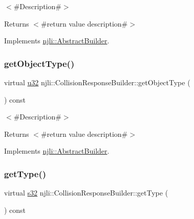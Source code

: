 $<$\#\+Description\#$>$

\begin{DoxyReturn}{Returns}
$<$\#return value description\#$>$ 
\end{DoxyReturn}


Implements \mbox{\hyperlink{classnjli_1_1_abstract_builder_a902f73ea78031b06aca183a417f3413b}{njli\+::\+Abstract\+Builder}}.

\mbox{\label{classnjli_1_1_collision_response_builder_a591d32b0605daad09aa789608105e5df}} 
\subsubsection{\texorpdfstring{get\+Object\+Type()}{getObjectType()}}
{\footnotesize\ttfamily virtual \mbox{\hyperlink{_util_8h_a10e94b422ef0c20dcdec20d31a1f5049}{u32}} njli\+::\+Collision\+Response\+Builder\+::get\+Object\+Type (\begin{DoxyParamCaption}{ }\end{DoxyParamCaption}) const\hspace{0.3cm}{\ttfamily [virtual]}}

$<$\#\+Description\#$>$

\begin{DoxyReturn}{Returns}
$<$\#return value description\#$>$ 
\end{DoxyReturn}


Implements \mbox{\hyperlink{classnjli_1_1_abstract_builder_a0f2d344fcf697b167f4f2b1122b5fb33}{njli\+::\+Abstract\+Builder}}.

\mbox{\label{classnjli_1_1_collision_response_builder_a38a4a2b429c82f2031349228b4d70967}} 
\subsubsection{\texorpdfstring{get\+Type()}{getType()}}
{\footnotesize\ttfamily virtual \mbox{\hyperlink{_util_8h_aa62c75d314a0d1f37f79c4b73b2292e2}{s32}} njli\+::\+Collision\+Response\+Builder\+::get\+Type (\begin{DoxyParamCaption}{ }\end{DoxyParamCaption}) const\hspace{0.3cm}{\ttfamily [virtual]}}


